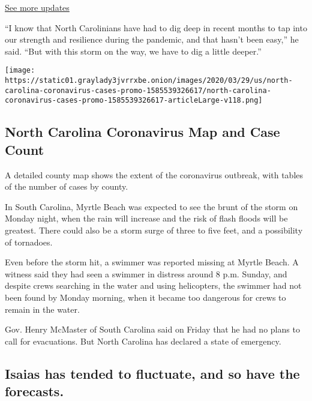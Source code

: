 \href{https://www.nytimes3xbfgragh.onion/2020/08/04/us/isaias-storm-updates.html?action=click\&pgtype=Article\&state=default\&region=MAIN_CONTENT_1\&context=storylines_live_updates}{See
more updates}

``I know that North Carolinians have had to dig deep in recent months to
tap into our strength and resilience during the pandemic, and that
hasn't been easy,'' he said. ``But with this storm on the way, we have
to dig a little deeper.''

\href{https://www.nytimes3xbfgragh.onion/interactive/2020/us/north-carolina-coronavirus-cases.html}{}

\texttt{[image: https://static01.graylady3jvrrxbe.onion/images/2020/03/29/us/north-carolina-coronavirus-cases-promo-1585539326617/north-carolina-coronavirus-cases-promo-1585539326617-articleLarge-v118.png]}

\hypertarget{north-carolina-coronavirus-map-and-case-count}{%
\subsection{North Carolina Coronavirus Map and Case
Count}\label{north-carolina-coronavirus-map-and-case-count}}

A detailed county map shows the extent of the coronavirus outbreak, with
tables of the number of cases by county.

In South Carolina, Myrtle Beach was expected to see the brunt of the
storm on Monday night, when the rain will increase and the risk of flash
floods will be greatest. There could also be a storm surge of three to
five feet, and a possibility of tornadoes.

Even before the storm hit, a swimmer was reported missing at Myrtle
Beach. A witness said they had seen a swimmer in distress around 8 p.m.
Sunday, and despite crews searching in the water and using helicopters,
the swimmer had not been found by Monday morning, when it became too
dangerous for crews to remain in the water.

Gov. Henry McMaster of South Carolina said on Friday that he had no
plans to call for evacuations. But North Carolina has declared a state
of emergency.

\hypertarget{isaias-has-tended-to-fluctuate-and-so-have-the-forecasts}{%
\subsection{Isaias has tended to fluctuate, and so have the
forecasts.}\label{isaias-has-tended-to-fluctuate-and-so-have-the-forecasts}}

